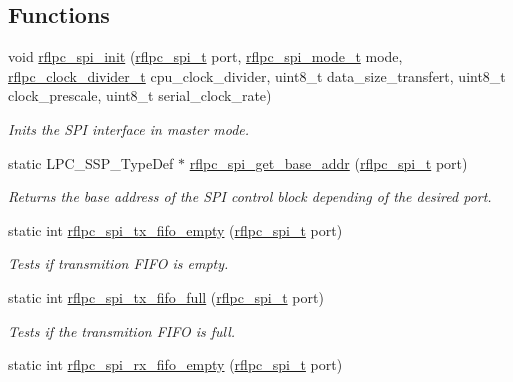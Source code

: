 \subsection*{Functions}
\begin{DoxyCompactItemize}
\item 
void \hyperlink{group__spi_gabd4125872b2ec4da410f8f0446e3f47a}{rflpc\-\_\-spi\-\_\-init} (\hyperlink{group__spi_gacd0981a3c68e5b6af8c07d7638cb9156}{rflpc\-\_\-spi\-\_\-t} port, \hyperlink{group__spi_gacdd9f294e5d1e913729ec8a9bb715e37}{rflpc\-\_\-spi\-\_\-mode\-\_\-t} mode, \hyperlink{group__clock_gaf3b7fc561cd12dfdff9f7c1357c3f016}{rflpc\-\_\-clock\-\_\-divider\-\_\-t} cpu\-\_\-clock\-\_\-divider, uint8\-\_\-t data\-\_\-size\-\_\-transfert, uint8\-\_\-t clock\-\_\-prescale, uint8\-\_\-t serial\-\_\-clock\-\_\-rate)
\begin{DoxyCompactList}\small\item\em Inits the S\-P\-I interface in master mode. \end{DoxyCompactList}\item 
static L\-P\-C\-\_\-\-S\-S\-P\-\_\-\-Type\-Def $\ast$ \hyperlink{group__spi_gaafcca6b7f7909fff39ba58b75c701e57}{rflpc\-\_\-spi\-\_\-get\-\_\-base\-\_\-addr} (\hyperlink{group__spi_gacd0981a3c68e5b6af8c07d7638cb9156}{rflpc\-\_\-spi\-\_\-t} port)
\begin{DoxyCompactList}\small\item\em Returns the base address of the S\-P\-I control block depending of the desired port. \end{DoxyCompactList}\item 
static int \hyperlink{group__spi_ga9d76c0a2207df05a0016b7cf5f992248}{rflpc\-\_\-spi\-\_\-tx\-\_\-fifo\-\_\-empty} (\hyperlink{group__spi_gacd0981a3c68e5b6af8c07d7638cb9156}{rflpc\-\_\-spi\-\_\-t} port)
\begin{DoxyCompactList}\small\item\em Tests if transmition F\-I\-F\-O is empty. \end{DoxyCompactList}\item 
static int \hyperlink{group__spi_ga4336258f89f340435c1971bff1c452ec}{rflpc\-\_\-spi\-\_\-tx\-\_\-fifo\-\_\-full} (\hyperlink{group__spi_gacd0981a3c68e5b6af8c07d7638cb9156}{rflpc\-\_\-spi\-\_\-t} port)
\begin{DoxyCompactList}\small\item\em Tests if the transmition F\-I\-F\-O is full. \end{DoxyCompactList}\item 
static int \hyperlink{group__spi_ga0080a0144c29fba657836ed20916ee9f}{rflpc\-\_\-spi\-\_\-rx\-\_\-fifo\-\_\-empty} (\hyperlink{group__spi_gacd0981a3c68e5b6af8c07d7638cb9156}{rflpc\-\_\-spi\-\_\-t} port)

\end{DoxyCompactItemize}
